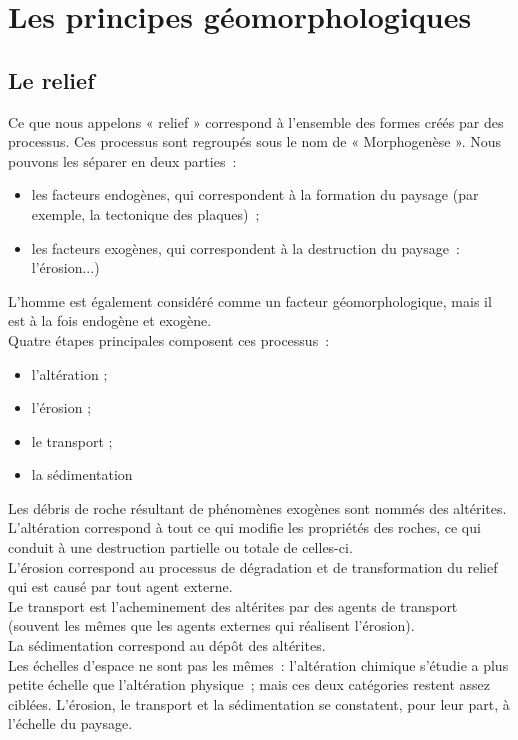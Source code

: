 \documentclass[a4paper,11pt]{article}
\begin{document}
\section{Les principes géomorphologiques}

\subsection{Le relief}

Ce que nous appelons « relief » correspond à l'ensemble des formes créés par des processus.
Ces processus sont regroupés sous le nom de « Morphogenèse ».
Nous pouvons les séparer en deux parties~:
\begin{itemize}
  \item les facteurs endogènes, qui correspondent à la formation du paysage (par exemple, la tectonique des plaques)~;
  \item les facteurs exogènes, qui correspondent à la destruction du paysage~: l'érosion...)
\end{itemize}
L'homme est également considéré comme un facteur géomorphologique, mais il est à la fois endogène et exogène. \\

Quatre étapes principales composent ces processus~:
\begin{itemize}
  \item l'altération ;
  \item l'érosion ;
  \item le transport ;
  \item la sédimentation
\end{itemize}
Les débris de roche résultant de phénomènes exogènes sont nommés des altérites. \\
L'altération correspond à tout ce qui modifie les propriétés des roches, ce qui conduit à une destruction partielle ou totale de celles-ci. \\
L'érosion correspond au processus de dégradation et de transformation du relief qui est causé par tout agent externe. \\
Le transport est l'acheminement des altérites par des agents de transport (souvent les mêmes que les agents externes qui réalisent l'érosion). \\
La sédimentation correspond au dépôt des altérites. \\

Les échelles d'espace ne sont pas les mêmes~: l'altération chimique s'étudie a plus petite échelle que l'altération physique~; mais ces deux catégories restent assez ciblées.
L'érosion, le transport et la sédimentation se constatent, pour leur part, à l'échelle du paysage. \\
\end{document}
